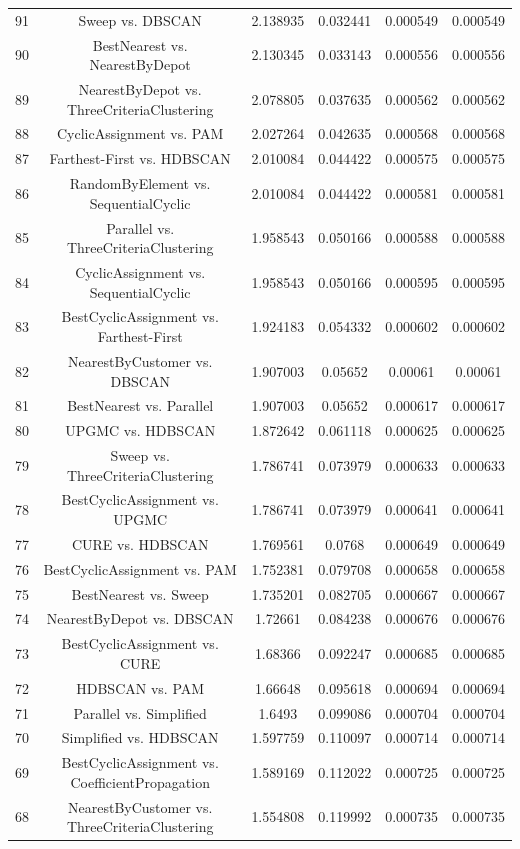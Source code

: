 \documentclass[a4paper,10pt]{article}
\begin{document}
\begin{landscape}
\begin{table}[!htp]
\begin{tabular}{cccccc}
91&Sweep vs. DBSCAN&2.138935&0.032441&0.000549&0.000549\\
90&BestNearest vs. NearestByDepot&2.130345&0.033143&0.000556&0.000556\\
89&NearestByDepot vs. ThreeCriteriaClustering&2.078805&0.037635&0.000562&0.000562\\
88&CyclicAssignment vs. PAM&2.027264&0.042635&0.000568&0.000568\\
87&Farthest-First vs. HDBSCAN&2.010084&0.044422&0.000575&0.000575\\
86&RandomByElement vs. SequentialCyclic&2.010084&0.044422&0.000581&0.000581\\
85&Parallel vs. ThreeCriteriaClustering&1.958543&0.050166&0.000588&0.000588\\
84&CyclicAssignment vs. SequentialCyclic&1.958543&0.050166&0.000595&0.000595\\
83&BestCyclicAssignment vs. Farthest-First&1.924183&0.054332&0.000602&0.000602\\
82&NearestByCustomer vs. DBSCAN&1.907003&0.05652&0.00061&0.00061\\
81&BestNearest vs. Parallel&1.907003&0.05652&0.000617&0.000617\\
80&UPGMC vs. HDBSCAN&1.872642&0.061118&0.000625&0.000625\\
79&Sweep vs. ThreeCriteriaClustering&1.786741&0.073979&0.000633&0.000633\\
78&BestCyclicAssignment vs. UPGMC&1.786741&0.073979&0.000641&0.000641\\
77&CURE vs. HDBSCAN&1.769561&0.0768&0.000649&0.000649\\
76&BestCyclicAssignment vs. PAM&1.752381&0.079708&0.000658&0.000658\\
75&BestNearest vs. Sweep&1.735201&0.082705&0.000667&0.000667\\
74&NearestByDepot vs. DBSCAN&1.72661&0.084238&0.000676&0.000676\\
73&BestCyclicAssignment vs. CURE&1.68366&0.092247&0.000685&0.000685\\
72&HDBSCAN vs. PAM&1.66648&0.095618&0.000694&0.000694\\
71&Parallel vs. Simplified&1.6493&0.099086&0.000704&0.000704\\
70&Simplified vs. HDBSCAN&1.597759&0.110097&0.000714&0.000714\\
69&BestCyclicAssignment vs. CoefficientPropagation&1.589169&0.112022&0.000725&0.000725\\
68&NearestByCustomer vs. ThreeCriteriaClustering&1.554808&0.119992&0.000735&0.000735\\

\end{tabular}
\end{table}
\end{landscape}
\end{document}
